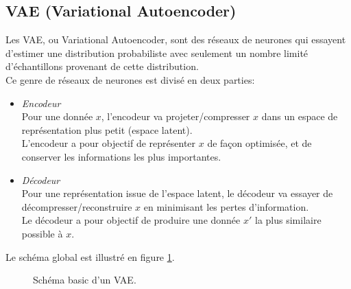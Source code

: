 \begin{appendices}
\section*{VAE (Variational Autoencoder)}\label{app:variational_autoencoder}
Les VAE, ou Variational Autoencoder, sont des réseaux de neurones qui essayent d'estimer une distribution probabiliste avec seulement un nombre limité d'échantillons provenant de cette distribution.\\
Ce genre de réseaux de neurones est divisé en deux parties:\\
\begin{itemize}
	\item \emph{Encodeur}\\
	Pour une donnée $x$, l'encodeur va projeter/compresser $x$ dans un espace de représentation plus petit (espace latent).\\
	L'encodeur a pour objectif de représenter $x$ de façon optimisée, et de conserver les informations les plus importantes.\\
	\item \emph{Décodeur}\\
	Pour une représentation issue de l'espace latent, le décodeur va essayer de décompresser/reconstruire $x$ en minimisant les pertes d'information.\\
	Le décodeur a pour objectif de produire une donnée $x'$ la plus similaire possible à $x$.\\
\end{itemize}
	
Le schéma global est illustré en figure \ref{fig:vae_scheme}.
\begin{figure}[!htbp]
\center
\caption{Schéma basic d'un VAE.}
\label{fig:vae_scheme}
\end{figure}
\FloatBarrier

\end{appendices}

\clearpage
